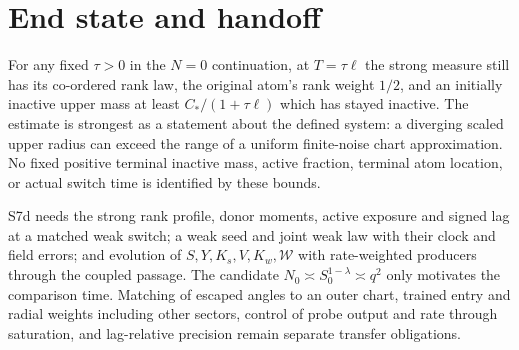 \documentclass[11pt]{article}
\begin{document}
\section{End state and handoff}\label{an04impv1:handoff}
For any fixed \(\tau>0\) in the \(N=0\) continuation, at
\(T=\tau\ell\) the strong measure still has its co-ordered rank law,
the original atom's rank weight \(1/2\), and an initially inactive
upper mass at least \(C_* /(1+\tau\ell)\) which has stayed inactive.
The estimate is strongest as a statement about the defined system:
a diverging scaled upper radius can exceed the range of a uniform
finite-noise chart approximation. No fixed positive terminal inactive
mass, active fraction, terminal atom location, or actual switch time
is identified by these bounds.

S7d needs the strong rank profile, donor moments, active exposure and
signed lag at a matched weak switch; a weak seed and joint weak law
with their clock and field errors; and evolution of \(S,Y,K_s,V,K_w,
\mathcal W\) with rate-weighted producers through the coupled passage.
The candidate \(N_0\asymp S_0^{1-\lambda}\asymp q^2\) only motivates
the comparison time. Matching of escaped angles to an outer chart,
trained entry and radial weights including other sectors, control
of probe output and rate through saturation, and lag-relative
precision remain separate transfer obligations.
\end{document}

